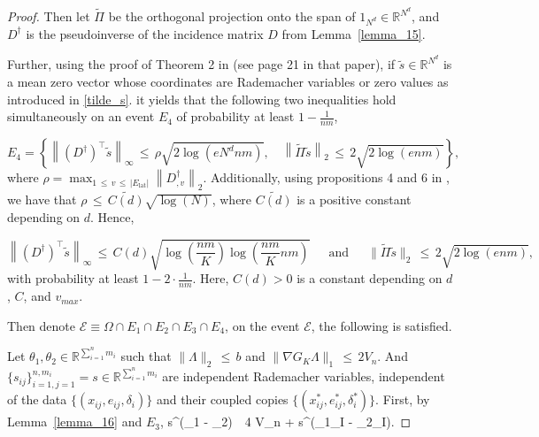 \documentclass[twoside,11pt]{article}
\begin{document}
\begin{proof}
Then let \(\tilde \Pi\) be the orthogonal projection onto the span of \(1_{N^d} \in \mathbb{R}^{N^d}\), and \(D^\dag\) is the pseudoinverse of the incidence matrix \(D\) from Lemma~\ref{lemma_15}.


Further, using the proof of Theorem 2 in \cite{hutter2016optimal} (see page 21 in that paper), if \(\tilde s \in \mathbb{R}^{N^d}\) is a mean zero vector whose coordinates are Rademacher variables or zero values as introduced in \eqref{tilde_s}. it yields that the following two inequalities hold simultaneously on an event \(E_4\) of probability at least   \(1 - \frac{1}{nm}\),


\[
E_4 = \left\{ \left\| (D^\dag)^\top \tilde s\right\|_{\infty} \,\leq\,  \rho \sqrt{2\log(eN^d nm)}, \quad \left\| \tilde \Pi \tilde s \right\|_2 \,\leq\, 2\sqrt{2\log(enm)} \right\},
\]
where \(\rho = \max_{1 \,\leq\, v \,\leq\, |E_{\text{lat}}|} \left\| D^\dag_{,v} \right\|_2\). Additionally, using propositions 4 and 6 in \cite{hutter2016optimal}, we have that \(\rho \,\leq\, \widetilde{C(d)} \sqrt{\log(N)}\), where \( \widetilde{C(d)}\) is a positive constant depending on \(d\). Hence,

\[
\left\| (D^\dag)^\top \tilde s\right\|_{\infty} \,\leq\,  C(d) \sqrt{\log\left(\frac{nm}{K}\right) \log\left(\frac{nm}{K} nm\right)} \quad \,\,\,\text{and}\,\,\, \quad \|\tilde \Pi \tilde s\|_2 \,\leq\, 2\sqrt{2\log(enm)},
\]
with probability at least \(1 - 2 \cdot \frac{1}{nm}\). Here, \(C(d) > 0\) is a constant depending on \(d\), \(C\), and \(v_{max}\).


Then denote $\mathcal{E} \equiv \Omega \cap E_1 \cap E_2 \cap E_3 \cap E_4$, on the event $\mathcal{E}$, the following is satisfied. 

Let \(\theta_1,\theta_2 \in \mathbb{R}^{\sum_{i = 1}^n   m_i}\) such that \(\|\varLambda\|_2 \,\leq\, b\) and \(\|\nabla{G_K} \varLambda\|_1 \,\leq\, 2V_n\). And \(\{s_{ij}\}^{n,m_i}_{i=1,j=1} = s\in \mathbb{R}^{\sum_{i = 1}^n   m_i}\) are independent Rademacher variables, independent of the data $\{(x_{ij}, e_{ij}, \delta_i)\}$ and their coupled copies $\{(x_{ij}^*, e_{ij}^*, \delta_i^*)\}$.
First, by Lemma~\ref{lemma_16} and \(E_3\), 
\bea
s^\top(\theta_1 - \theta_2) \,\leq\, 4 V_n + s^\top({\theta_1}_I - {\theta_2}_I).
\bea 


\end{proof}
\end{document}
